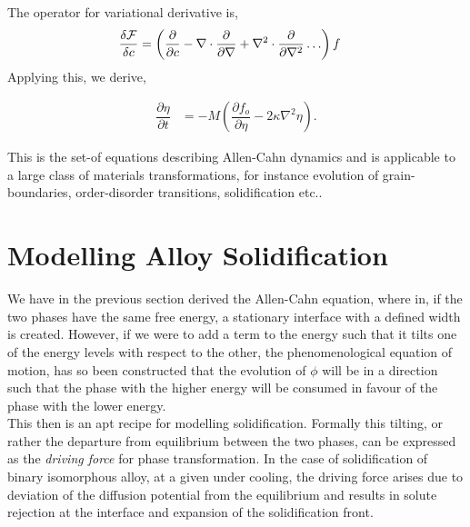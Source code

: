 \documentclass[a4paper]{report}
\begin{document}
The operator for variational derivative is,
\begin{align}
 \dfrac{\delta {\cal F}}{\delta c} &= \left(\dfrac{\partial}{\partial c} - 
 \nabla \cdot \dfrac{\partial}{\partial \nabla} + \nabla^{2}\cdot\dfrac{\partial }{\partial \nabla^{2}}\ldots\right)f  
 \label{variational_derivative}
\end{align}
Applying this, we derive,

\begin{align}
 \dfrac{\partial \eta}{\partial t} &= -M \left(\dfrac{\partial f_o}{\partial \eta} - 2\kappa\nabla^{2}\eta\right).
\end{align}
 
This is the set-of equations describing Allen-Cahn dynamics and is applicable to a large 
class of materials transformations, for instance evolution of grain-boundaries, 
order-disorder transitions, solidification etc.. 

\section{Modelling Alloy Solidification}

We have in the previous section derived the Allen-Cahn equation, where in, 
if the two phases have the same free energy, a stationary interface with
a defined width is created. However, if we were to add a term to the energy 
such that it tilts one of the energy levels with respect 
to the other, the phenomenological equation of motion, has so been constructed 
that the evolution of $\phi$ will be in a direction such that the phase 
with the higher energy will be consumed in favour of the phase with the lower energy.\\

This then is an apt recipe for modelling solidification. Formally this tilting, or 
rather the departure from equilibrium between the two phases, can be expressed as the 
\textit{driving force} for phase transformation.
In the case of solidification of binary isomorphous alloy, at a given under cooling, 
the driving force arises due to deviation of the diffusion potential from the equilibrium 
and results in solute rejection at the interface and expansion
of the solidification front.
\end{document}
